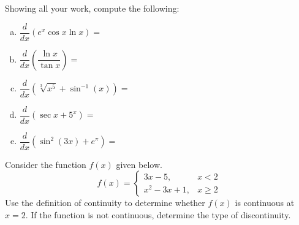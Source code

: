 \documentclass[12pt,letterpaper]{exam}
\begin{document}
\begin{questions}
\newpage
\question[20] Showing all your work, compute the following: \par\vspace{0.5cm}
	\begin{enumerate}[(a)]
	\item $\dfrac{d}{dx} \left(e^x \cos x \ln x \right)=$ \vfill
	\item $\dfrac{d}{dx} \left( \dfrac{\ln x}{\tan x} \right)= $ \vfill
	\item $\dfrac{d}{dx} \left( \sqrt[3]{x^5} + \sin^{-1}(x) \right)=$ \vfill
	\item $\dfrac{d}{dx} \left( \sec x + 5^x \right)=$ \vfill
	\item $\dfrac{d}{dx} \left( \sin^2(3x) + e^\pi \right)=$ \vfill
	\end{enumerate}



\newpage
\question[20] Consider the function $f(x)$ given below.
	\[
	f(x)= 
	\begin{cases}
	3x - 5, & x < 2 \\
	x^2 - 3x + 1, & x \geq 2
	\end{cases}
	\]
Use the definition of continuity to determine whether $f(x)$ is continuous at $x= 2$. If the function is not continuous, determine the type of discontinuity. 

\end{questions}
\end{document}
